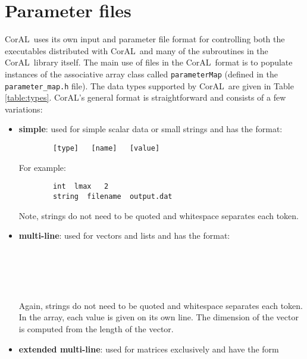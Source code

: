 \documentclass[10pt]{article}
\newcommand{\coral}{CorAL}
\begin{document}
\section{Parameter files}
\coral \ uses its own input and parameter file format for controlling both the executables distributed with \coral \ and many of the subroutines in the \coral \ library itself.  The main use of files in the \coral \ format is to populate instances of the associative array class called {\tt parameterMap} (defined in the {\tt parameter\_map.h} file).  The data types supported by \coral \ are given in Table \ref{table:types}.  \coral's general format is straightforward and consists of a few variations:
\begin{itemize}
	\item {\bf simple}: used for simple scalar data or small strings and has the format:\\
	\begin{verbatim}
        [type]   [name]   [value]
	\end{verbatim}
	For example:
	\begin{verbatim}
        int  lmax   2
        string  filename  output.dat
	\end{verbatim}
	Note, strings do not need to be quoted and whitespace separates each token.
	\item {\bf multi-line}: used for vectors and lists and has the format:\\
			\\
			\hspace*{0.5 in}{\tt value0}\\
			\hspace*{0.5 in}{\tt value1}\\
			\hspace*{0.5 in}{\tt ...}\\
			\hspace*{0.25 in}{\tt \}}\\
	Again, strings do not need to be quoted and whitespace separates each token.  In the array, each value is given on its own line.  The dimension of the vector is computed from the length of the vector.
	\item {\bf extended multi-line}: used for matrices exclusively and have the form\\
			\\

\end{itemize}
\end{document}

